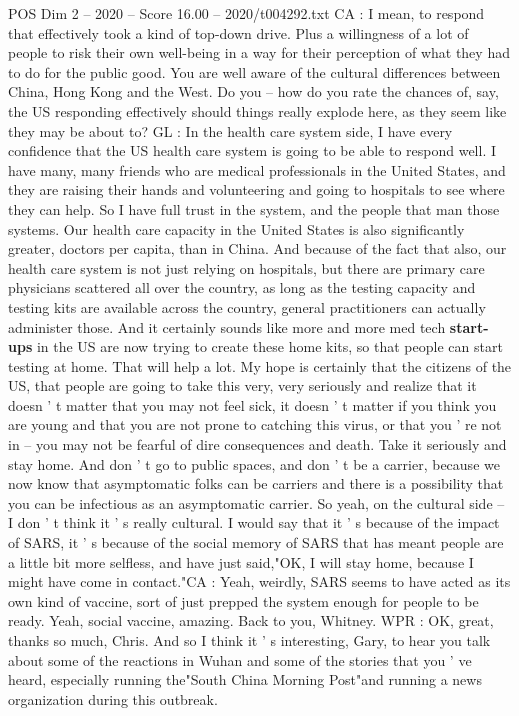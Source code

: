 \begin{textsample}{POS Dim 2 – 2020 – Score 16.00 – 2020/t004292.txt}
CA : I mean, to respond that effectively took a kind of top-down drive.
Plus a willingness of a lot of people to risk their own well-being in a way for their perception of what they had to do for the public good.
You are well aware of the cultural differences between China, Hong Kong and the West.
Do you -- how do you rate the chances of, say, the US responding effectively should things really explode here, as they seem like they may be about to?
GL : In the health care system side, I have every confidence that the US health care system is going to be able to respond well.
I have many, many friends who are medical professionals in the United States, and they are raising their hands and volunteering and going to hospitals to see where they can help.
So I have full trust in the system, and the people that man those systems.
Our health care capacity in the United States is also significantly greater, doctors per capita, than in China.
And because of the fact that also, our health care system is not just relying on hospitals, but there are primary care physicians scattered all over the country, as long as the testing capacity and testing kits are available across the country, general practitioners can actually administer those.
And it certainly sounds like more and more med tech \textbf{start-ups} in the US are now trying to create these home kits, so that people can start testing at home.
That will help a lot.
My hope is certainly that the citizens of the US, that people are going to take this very, very seriously and realize that it doesn ' t matter that you may not feel sick, it doesn ' t matter if you think you are young and that you are not prone to catching this virus, or that you ' re not in -- you may not be fearful of dire consequences and death.
Take it seriously and stay home.
And don ' t go to public spaces, and don ' t be a carrier, because we now know that asymptomatic folks can be carriers and there is a possibility that you can be infectious as an asymptomatic carrier.
So yeah, on the cultural side -- I don ' t think it ' s really cultural.
I would say that it ' s because of the impact of SARS, it ' s because of the social memory of SARS that has meant people are a little bit more selfless, and have just said,"OK, I will stay home, because I might have come in contact."CA : Yeah, weirdly, SARS seems to have acted as its own kind of vaccine, sort of just prepped the system enough for people to be ready.
Yeah, social vaccine, amazing.
Back to you, Whitney.
WPR : OK, great, thanks so much, Chris.
And so I think it ' s interesting, Gary, to hear you talk about some of the reactions in Wuhan and some of the stories that you ' ve heard, especially running the"South China Morning Post"and running a news organization during this outbreak.

\end{textsample}
